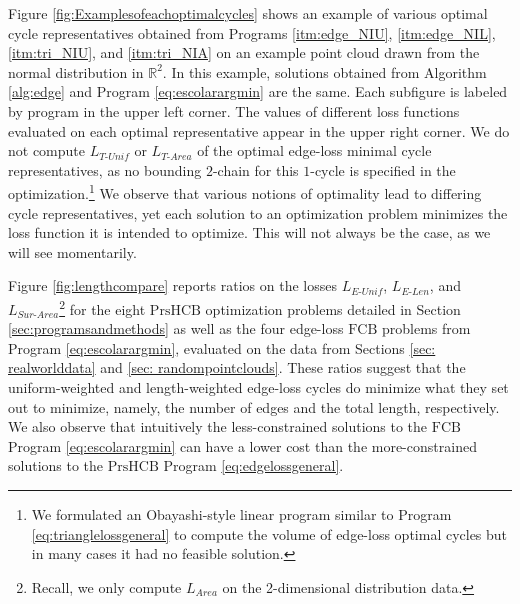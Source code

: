 \documentclass[11pt,onecolumn]{article}
\newcommand{\R}{\mathbb{R}}
\newcommand{\se}{Section }
\newcommand{\fig}{Figure }
\newcommand{\NI}{^{NI}}
\newcommand{\setoffilteredcyclebases}{\mathrm{FCB}}
\newcommand{\setofpersistenthcyclebases}{\mathrm{PrsHCB}}
\newcommand{\pr}{Program }
\newcommand{\EU}{_{E\text{-}Unif}}
\newcommand{\EL}{_{E\text{-}Len}}
\newcommand{\TU}{_{T\text{-}Unif}}
\newcommand{\TA}{_{T\text{-}Area}}
\theoremstyle{plain}
\theoremstyle{definition}
\begin{document}
\fig \ref{fig:Examplesofeachoptimalcycles} shows an example of various optimal cycle representatives obtained from Programs
\ref{itm:edge_NIU},
\ref{itm:edge_NIL},
\ref{itm:tri_NIU}, and
\ref{itm:tri_NIA}
on an example point cloud drawn from the normal distribution in $\R^2$. In this example, solutions obtained from Algorithm \ref{alg:edge} and \pr \eqref{eq:escolarargmin} are the same. Each subfigure is labeled by program in the upper left corner. The values of different loss functions evaluated on each optimal representative appear in the upper right corner.  
We do not compute $L\TU$ or $L\TA$ of the optimal edge-loss minimal cycle representatives, as no bounding $2$-chain for this $1$-cycle is specified in the optimization.\footnote{We formulated an Obayashi-style linear program similar to \pr \eqref{eq:trianglelossgeneral} to compute the volume of edge-loss optimal cycles but in many cases it had no feasible solution.} We observe that various notions of optimality lead to differing cycle representatives, yet each solution to an optimization problem minimizes the loss function it is intended to optimize. This will not always be the case, as we will see momentarily.

\fig\ref{fig:lengthcompare} reports ratios on the losses $L\EU$, $L\EL$, and $L_{Sur\text{-}Area}$\footnote{Recall, we only compute $L_{Area}$ on the 2-dimensional distribution data.} for the eight $\setofpersistenthcyclebases$ optimization problems detailed in \se \ref{sec:programsandmethods} as well as the four edge-loss $\setoffilteredcyclebases$ problems from \pr \eqref{eq:escolarargmin}, evaluated on the data from Sections \ref{sec: realworlddata} and \ref{sec: randompointclouds}. 
These ratios suggest that the uniform-weighted and length-weighted edge-loss cycles do minimize what they set out to minimize, namely, the number of edges and the total length, respectively. We also observe that intuitively the less-constrained solutions to the $\setoffilteredcyclebases$ \pr \eqref{eq:escolarargmin} can have a lower cost than the more-constrained solutions to the $\setofpersistenthcyclebases$ \pr \eqref{eq:edgelossgeneral}. 
 
\end{document}

